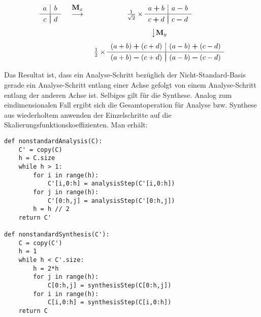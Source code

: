 \documentclass{article}
\begin{document}
\[
\begin{array}{ccc}
\begin{array}{c|c}
a & b \\[.05cm] 
\hline \\[-0.35cm]
c & d
\end{array}
&
\begin{array}{c}
 \\[-0.3cm] \mathbf{M}_x \\[-0.1cm] \longrightarrow \\ \\
\end{array}
&
\frac{1}{\sqrt{2}} \times
\begin{array}{c|c}
a\boldsymbol{+}b & a\boldsymbol{-}b \\[.05cm] 
\hline \\[-0.35cm]
c\boldsymbol{+}d & c\boldsymbol{-}d
\end{array}
\\[.5cm]
 & & \big\downarrow \mathbf{M}_y \\[.25cm]
 & &
\frac{1}{2} \times
\begin{array}{c|c}
(a+b)\boldsymbol{+}(c+d) & (a-b)\boldsymbol{+}(c-d) \\[.05cm] 
\hline \\[-0.35cm]
(a+b)\boldsymbol{-}(c+d) & (a-b)\boldsymbol{-}(c-d)
\end{array}
\\
\end{array}
\]

\noindent Das Resultat ist, dass ein Analyse-Schritt bezüglich der Nicht-Standard-Basis gerade ein Analyse-Schritt entlang einer Achse gefolgt von einem Analyse-Schritt entlang der anderen Achse ist. Selbiges gilt für die Synthese. Analog zum eindimensionalen Fall ergibt sich die Gesamtoperation für Analyse bzw. Synthese aus wiederholtem anwenden der Einzelschritte auf die Skalierungsfunktionskoeffizienten. Man erhält:

\begin{verbatim}
def nonstandardAnalysis(C):
    C' = copy(C)
    h = C.size
    while h > 1:
        for i in range(h):
            C'[i,0:h] = analysisStep(C'[i,0:h])
        for j in range(h):
            C'[0:h,j] = analysisStep(C'[0:h,j])
        h = h // 2
    return C'

def nonstandardSynthesis(C'):
    C = copy(C')
    h = 1
    while h < C'.size:
        h = 2*h
        for j in range(h):
            C[0:h,j] = synthesisStep(C[0:h,j])
        for i in range(h):
            C[i,0:h] = synthesisStep(C[i,0:h])
    return C
\end{verbatim}
\end{document}
